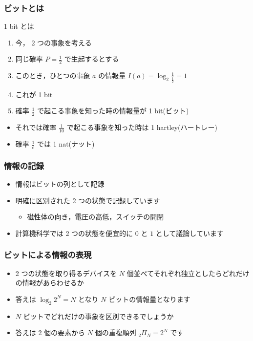 \begin{frame}
\frametitle{ビットとは}
  \begin{block}{1 bit とは}
    \begin{enumerate}
\item 今， 2 つの事象を考える
\item 同じ確率 \(P=\frac{1}{2}\) で生起するとする
\item このとき，ひとつの事象 $a$ の情報量 \(I(a)=\log_2\frac{1}{\frac{1}{2}}=1\)
\item これが 1 bit
\item 確率 \(\frac{1}{2}\) で起こる事象を知った時の情報量が 1 bit(ビット)
    \end{enumerate}
  \end{block}
  \begin{itemize}
\item それでは確率 \(\frac{1}{10}\) で起こる事象を知った時は 1 hartley(ハートレー)
\item 確率 \(\frac{1}{e}\) では 1 nat(ナット)
  \end{itemize}
\end{frame}
\begin{frame}
\frametitle{情報の記録}
  \begin{itemize}
\item 情報はビットの列として記録
\item 明確に区別された 2 つの状態で記録しています
    \begin{itemize}
\item 磁性体の向き，電圧の高低，スイッチの開閉
    \end{itemize}
\item 計算機科学では 2 つの状態を便宜的に $0$ と $1$ として議論しています
  \end{itemize}
\end{frame}
\begin{frame}
\frametitle{ビットによる情報の表現}
  \begin{itemize}
\item 2 つの状態を取り得るデバイスを $N$ 個並べてそれぞれ独立としたらどれだけの情報があらわせるか
\item 答えは \(\log_2 2^N=N\) となり $N$ ビットの情報量となります
\item $N$ ビットでどれだけの事象を区別できるでしょうか
\item 答えは 2 個の要素から $N$ 個の重複順列 \({ }_2\Pi_N=2^N\) です
  \end{itemize}
\end{frame}
